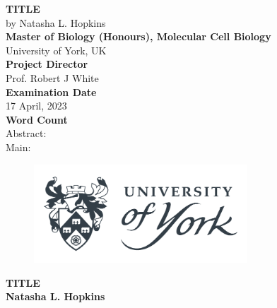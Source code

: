 \documentclass[
  11pt,
]{article}
\author{}
\date{\vspace{-2.5em}}
\begin{document}
\captionsetup{justification=raggedright,singlelinecheck=false}

\begin{center}
\vspace*{2\baselineskip}
\Huge
\textbf{TITLE}\\
\vspace*{1\baselineskip}
\Large{by Natasha L. Hopkins}\\
\vspace*{2\baselineskip}
\Large{\textbf{Master of Biology (Honours), Molecular Cell Biology}}\\
\Large{University of York, UK}\\
\vspace*{2\baselineskip}
\Large{\textbf{Project Director}}\\
Prof. Robert J White\\
\vspace*{2\baselineskip}
\Large{\textbf{Examination Date}}\\
17 April, 2023\\
\vspace*{2\baselineskip}
\Large{\textbf{Word Count}}\\
Abstract: \\
Main: \\
\vspace*{2\baselineskip}
\begin{figure}[h!]
\centering
  \includegraphics[width=8cm]{../images/uoy_logo.png}
  \label{}
\end{figure}
\end{center}

\hypersetup{linkcolor = black}
\newpage
\tableofcontents
\hypersetup{linkcolor = teal}
\newpage
\setlength{\columnsep}{25pt}
\linespread{2}
\setlength{\parindent}{0pt}
\huge
\textbf{TITLE}\\
\normalsize
\textbf{Natasha L. Hopkins}\\
\end{document}
